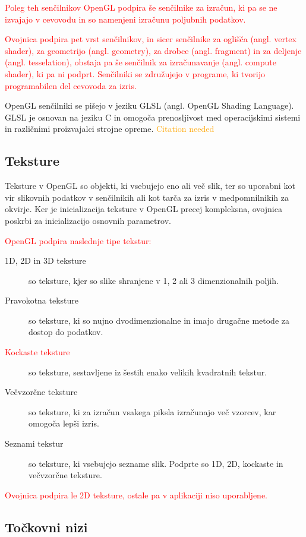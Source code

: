 \documentclass[a4paper, 12pt]{book}
\begin{document}
\textcolor{red}{Poleg teh senčilnikov OpenGL podpira še senčilnike za izračun, ki pa se ne izvajajo v cevovodu in so namenjeni izračunu poljubnih podatkov.}

\textcolor{red}{Ovojnica podpira pet vrst senčilnikov, in sicer senčilnike za oglišča (angl. vertex shader), za geometrijo (angl. geometry), za drobce (angl. fragment) in za deljenje (angl. tesselation), obstaja pa še senčilnik za izračunavanje (angl. compute shader), ki pa ni podprt. Senčilniki se združujejo v programe, ki tvorijo programabilen del cevovoda za izris.}

OpenGL senčilniki se pišejo v jeziku GLSL (angl. OpenGL Shading Language). GLSL je osnovan na jeziku C in omogoča prenosljivost med operacijskimi sistemi in različnimi proizvajalci strojne opreme. \textcolor{orange}{Citation needed}

\subsection*{Teksture}

Teksture v OpenGL so objekti, ki vsebujejo eno ali več slik, ter so uporabni kot vir slikovnih podatkov v senčilnikih ali kot tarča za izris v medpomnilnikih za okvirje. Ker je inicializacija teksture v OpenGL precej kompleksna, ovojnica poskrbi za inicializacijo osnovnih parametrov.

\textcolor{red}{OpenGL podpira naslednje tipe tekstur:}

\begin{description}
\item [1D, 2D in 3D teksture]so teksture, kjer so slike shranjene v 1, 2 ali 3 dimenzionalnih poljih.
\item [Pravokotna teksture]so teksture, ki so nujno dvodimenzionalne in imajo drugačne metode za dostop do podatkov.
\item [\textcolor{red}{Kockaste teksture}]so teksture, sestavljene iz šestih enako velikih kvadratnih tekstur.
\item [Večvzorčne teksture]so teksture, ki za izračun vsakega piksla izračunajo več vzorcev, kar omogoča lepši izris.
\item [Seznami tekstur]so teksture, ki vsebujejo sezname slik. Podprte so 1D, 2D, kockaste in večvzorčne teksture.
\end{description}

\textcolor{red}{Ovojnica podpira le 2D teksture, ostale pa v aplikaciji niso uporabljene.}

\subsection*{Točkovni nizi}
\end{document}
